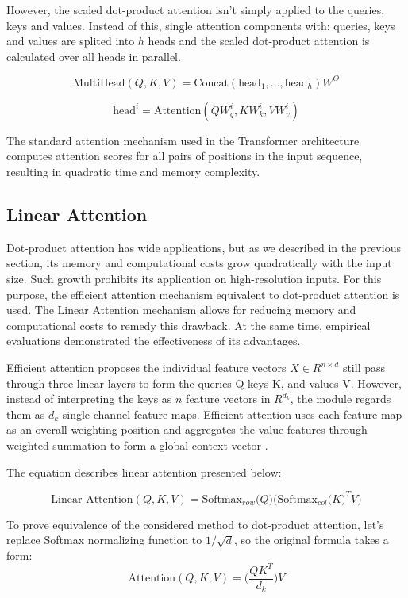 However, the scaled dot-product attention isn't simply applied to the queries, keys and values. Instead of this, single attention components with: queries, keys and values are splited into $ h $ heads and the scaled dot-product attention is calculated over all heads in parallel.

$$ \text{MultiHead}(Q, K, V) = \text{Concat}(\text{head}_1,...,\text{head}_h)W^O $$

$$ \text{head}^i = \text{Attention}(QW_q^i, KW_k^i, VW_v^i) $$

The standard attention mechanism used in the Transformer architecture computes attention scores for all pairs of positions in the input sequence, resulting in quadratic time and memory complexity.


\subsection{Linear Attention}

Dot-product attention has wide applications, but as we described in the previous section, its memory and computational costs grow quadratically with the input size. Such growth prohibits its application on high-resolution inputs. For this purpose, the efficient attention mechanism equivalent to dot-product attention is used. The Linear Attention mechanism allows for reducing memory and computational costs to remedy this drawback. At the same time, empirical evaluations \cite{linear-attention-transformer} demonstrated the effectiveness of its advantages.

Efficient attention proposes the individual feature vectors $ X \in R^{n \times d} $ still pass through three linear layers to form the queries Q keys K, and values V. However, instead of interpreting the keys as $n$ feature vectors in $R^{d_k}$, the module regards them as $d_k$ single-channel feature maps. Efficient attention uses each feature map as an overall weighting position and aggregates the value features through weighted summation to form a global context vector \cite{efficient-linear-attention}. 

The equation describes linear attention presented below:

$$ \text{Linear Attention}(Q, K, V) = \text{Softmax}_{row} \big(Q)\big ( \text{Softmax}_{col} \big( K \big)^T V) $$ 

To prove equivalence of the considered method to dot-product attention, let's replace Softmax normalizing function to $1 / \sqrt{d}$, so the original formula takes a form:
$$ \text{Attention}(Q, K, V) = \big( \frac{QK^T}{d_k} \big)V $$ 

